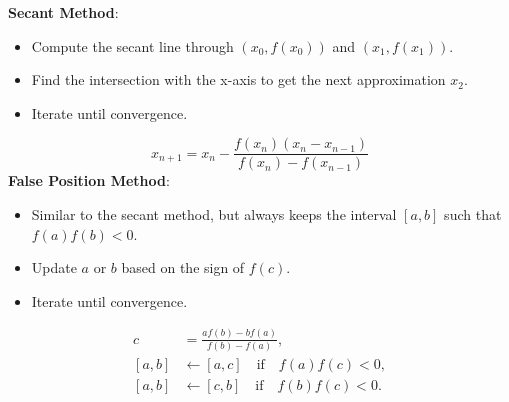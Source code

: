 \begin{definition}[Methods]
    \textbf{Secant Method}:
    \begin{itemize}
        \item Compute the secant line through $(x_0, f(x_0))$ and $(x_1, f(x_1))$.
        \item Find the intersection with the x-axis to get the next approximation $x_2$.
        \item Iterate until convergence.
    \end{itemize}
    \begin{equation}
        x_{n+1} = x_n - \frac{f(x_n)(x_n - x_{n-1})}{f(x_n) - f(x_{n-1})}   
    \end{equation}
    \textbf{False Position Method}:
    \begin{itemize}
        \item Similar to the secant method, but always keeps the interval $[a, b]$ such that $f(a)f(b) < 0$.
        \item Update $a$ or $b$ based on the sign of $f(c)$.
        \item Iterate until convergence.
    \end{itemize}
    $$
    \begin{aligned}
        c &= \frac{a f(b) - b f(a)}{f(b) - f(a)}, \\
        [a, b] &\gets [a, c] \quad \text{if} \quad f(a)f(c) < 0, \\
        [a, b] &\gets [c, b] \quad \text{if} \quad f(b)f(c) < 0.
    \end{aligned}
    $$
\end{definition}

